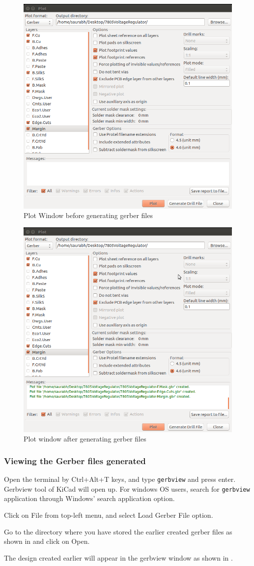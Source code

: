 \begin{figure}
\centering
\includegraphics[height=0.4\textwidth]{plotwindowbefore.png}
\caption{Plot Window before generating gerber files}
\label{plotbef}
\end{figure}

\begin{figure}
\centering
\includegraphics[height=0.4\textwidth]{plotafter.png}
\caption{Plot window after generating gerber files}
\label{plotaf}
\end{figure}

\subsubsection{Viewing the Gerber files generated}
\begin{compactenum}
\item Open the terminal by Ctrl+Alt+T keys, and type \texttt{gerbview} and press enter. Gerbview tool of KiCad will open up. For windows OS users, search for \texttt{gerbview} application through Windows' search application option.
\item Click on File from top-left menu, and select Load Gerber File option.
\item Go to the directory where you have stored the earlier created gerber files as shown in  and click on Open.
\item The design created earlier will appear in the gerbview window as shown in .
\end{compactenum}

